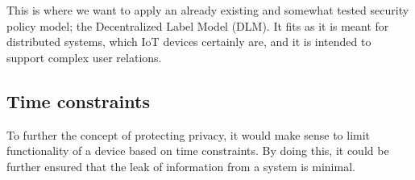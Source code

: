 This is where we want to apply an already existing and somewhat tested security policy model; the Decentralized Label Model (DLM).
It fits as it is meant for distributed systems, which IoT devices certainly are, and it is intended to support complex user relations.

\subsection{Time constraints}
To further the concept of protecting privacy, it would make sense to limit functionality of a device based on time constraints.
By doing this, it could be further ensured that the leak of information from a system is minimal.
